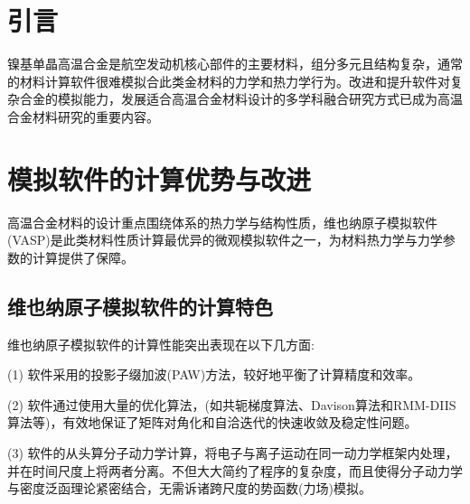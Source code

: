 \section{引言}
镍基单晶高温合金是航空发动机核心部件的主要材料，组分多元且结构复杂，通常的材料计算软件很难模拟合此类金材料的力学和热力学行为。改进和提升软件对复杂合金的模拟能力，发展适合高温合金材料设计的多学科融合研究方式已成为高温合金材料研究的重要内容。

\section{模拟软件的计算优势与改进}
高温合金材料的设计重点围绕体系的热力学与结构性质，维也纳原子模拟软件\textrm{(VASP)}是此类材料性质计算最优异的微观模拟软件之一，为材料热力学与力学参数的计算提供了保障。
\subsection{维也纳原子模拟软件的计算特色}
维也纳原子模拟软件的计算性能突出表现在以下几方面:

(1) 软件采用的投影子缀加波\textrm{(PAW)}方法，较好地平衡了计算精度和效率。

(2) 软件通过使用大量的优化算法，(如共轭梯度算法、\textrm{Davison}算法和\textrm{RMM-DIIS}算法等)，有效地保证了矩阵对角化和自洽迭代的快速收敛及稳定性问题。

(3) 软件的从头算分子动力学计算，将电子与离子运动在同一动力学框架内处理，并在时间尺度上将两者分离。不但大大简约了程序的复杂度，而且使得分子动力学与密度泛函理论紧密结合，无需诉诸跨尺度的势函数(力场)模拟。


